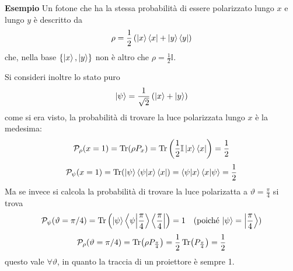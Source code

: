 \textbf{Esempio} Un fotone che ha la stessa probabilità di essere polarizzato lungo $x$ e lungo $y$
è descritto da
$$\rho=\frac{1}{2}\left(\ket{x}\bra{x}+\ket{y}\bra{y}\right)$$
che, nella base $\left\{\ket{x},\ket{y}\right\}$ non è altro che $\rho=\frac{1}{2}\mathbb{I}$.

Si consideri inoltre lo stato puro 
$$\ket{\psi}=\frac{1}{\sqrt{2}}\left(\ket{x}+\ket{y}\right)$$
come si era visto, la probabilità di trovare la luce polarizzata lungo $x$ è la medesima:
$$\mathcal{P}_\rho(x=1) = \Tr(\rho P_{x}) = \Tr\left(\frac{1}{2}\mathbb{I}\ket{x}\bra{x}\right) =
\frac{1}{2}$$
$$\mathcal{P}_\psi(x=1) = \Tr(\ket{\psi}\bra{\psi}\ket{x}\bra{x}) = \bra{\psi}\ket{x}\bra{x}\ket{\psi} = 
\frac{1}{2}$$
Ma se invece si calcola la probabilità di trovare la luce polarizatta a $\vartheta=\frac{\pi}{4}$ si trova
$$\mathcal{P}_\psi(\vartheta=\pi/4) = \Tr\left(\ket{\psi}\bra{\psi}\ket{\frac{\pi}{4}}\bra{\frac{\pi}{4}}\right) = 1
\quad\text{(poiché $\ket{\psi}=\ket{\frac{\pi}{4}}$)}
$$
$$\mathcal{P}_\rho(\vartheta=\pi/4) = \Tr(\rho P_{\frac{\pi}{4}}) = \frac{1}{2}\Tr(P_{\frac{\pi}{4}}) =
\frac{1}{2}$$
questo vale $\forall \vartheta$, in quanto la traccia di un proiettore è sempre 1.

